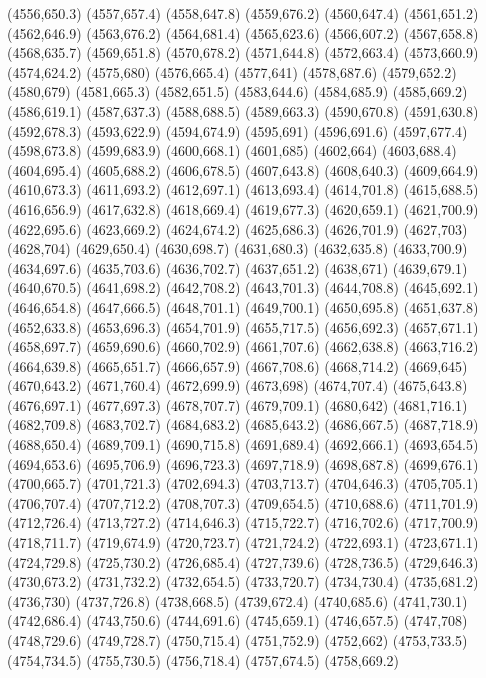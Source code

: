 (4556,650.3)
(4557,657.4)
(4558,647.8)
(4559,676.2)
(4560,647.4)
(4561,651.2)
(4562,646.9)
(4563,676.2)
(4564,681.4)
(4565,623.6)
(4566,607.2)
(4567,658.8)
(4568,635.7)
(4569,651.8)
(4570,678.2)
(4571,644.8)
(4572,663.4)
(4573,660.9)
(4574,624.2)
(4575,680)
(4576,665.4)
(4577,641)
(4578,687.6)
(4579,652.2)
(4580,679)
(4581,665.3)
(4582,651.5)
(4583,644.6)
(4584,685.9)
(4585,669.2)
(4586,619.1)
(4587,637.3)
(4588,688.5)
(4589,663.3)
(4590,670.8)
(4591,630.8)
(4592,678.3)
(4593,622.9)
(4594,674.9)
(4595,691)
(4596,691.6)
(4597,677.4)
(4598,673.8)
(4599,683.9)
(4600,668.1)
(4601,685)
(4602,664)
(4603,688.4)
(4604,695.4)
(4605,688.2)
(4606,678.5)
(4607,643.8)
(4608,640.3)
(4609,664.9)
(4610,673.3)
(4611,693.2)
(4612,697.1)
(4613,693.4)
(4614,701.8)
(4615,688.5)
(4616,656.9)
(4617,632.8)
(4618,669.4)
(4619,677.3)
(4620,659.1)
(4621,700.9)
(4622,695.6)
(4623,669.2)
(4624,674.2)
(4625,686.3)
(4626,701.9)
(4627,703)
(4628,704)
(4629,650.4)
(4630,698.7)
(4631,680.3)
(4632,635.8)
(4633,700.9)
(4634,697.6)
(4635,703.6)
(4636,702.7)
(4637,651.2)
(4638,671)
(4639,679.1)
(4640,670.5)
(4641,698.2)
(4642,708.2)
(4643,701.3)
(4644,708.8)
(4645,692.1)
(4646,654.8)
(4647,666.5)
(4648,701.1)
(4649,700.1)
(4650,695.8)
(4651,637.8)
(4652,633.8)
(4653,696.3)
(4654,701.9)
(4655,717.5)
(4656,692.3)
(4657,671.1)
(4658,697.7)
(4659,690.6)
(4660,702.9)
(4661,707.6)
(4662,638.8)
(4663,716.2)
(4664,639.8)
(4665,651.7)
(4666,657.9)
(4667,708.6)
(4668,714.2)
(4669,645)
(4670,643.2)
(4671,760.4)
(4672,699.9)
(4673,698)
(4674,707.4)
(4675,643.8)
(4676,697.1)
(4677,697.3)
(4678,707.7)
(4679,709.1)
(4680,642)
(4681,716.1)
(4682,709.8)
(4683,702.7)
(4684,683.2)
(4685,643.2)
(4686,667.5)
(4687,718.9)
(4688,650.4)
(4689,709.1)
(4690,715.8)
(4691,689.4)
(4692,666.1)
(4693,654.5)
(4694,653.6)
(4695,706.9)
(4696,723.3)
(4697,718.9)
(4698,687.8)
(4699,676.1)
(4700,665.7)
(4701,721.3)
(4702,694.3)
(4703,713.7)
(4704,646.3)
(4705,705.1)
(4706,707.4)
(4707,712.2)
(4708,707.3)
(4709,654.5)
(4710,688.6)
(4711,701.9)
(4712,726.4)
(4713,727.2)
(4714,646.3)
(4715,722.7)
(4716,702.6)
(4717,700.9)
(4718,711.7)
(4719,674.9)
(4720,723.7)
(4721,724.2)
(4722,693.1)
(4723,671.1)
(4724,729.8)
(4725,730.2)
(4726,685.4)
(4727,739.6)
(4728,736.5)
(4729,646.3)
(4730,673.2)
(4731,732.2)
(4732,654.5)
(4733,720.7)
(4734,730.4)
(4735,681.2)
(4736,730)
(4737,726.8)
(4738,668.5)
(4739,672.4)
(4740,685.6)
(4741,730.1)
(4742,686.4)
(4743,750.6)
(4744,691.6)
(4745,659.1)
(4746,657.5)
(4747,708)
(4748,729.6)
(4749,728.7)
(4750,715.4)
(4751,752.9)
(4752,662)
(4753,733.5)
(4754,734.5)
(4755,730.5)
(4756,718.4)
(4757,674.5)
(4758,669.2)
